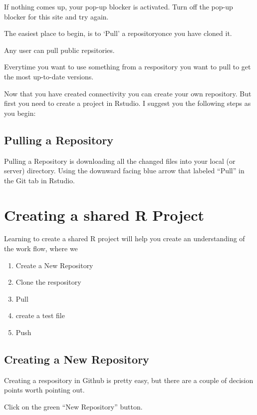 \documentclass[12pt]{../SOP3_beta}
\begin{document}
\NP If nothing comes up, your pop-up blocker is activated. Turn off the pop-up blocker for this site and try again. 



\NP The easiest place to begin, is to `Pull' a repositoryonce you have cloned it. 

\NP Any user can pull public repsitories. 

\NP Everytime you want to use something from a respository you want to pull to get the most up-to-date versions. 

\NP Now that you have created connectivity you can create your own repository. But first you need to create a project in Rstudio. I suggest you the following steps as you begin:



\subsection{Pulling a Repository}

\NP Pulling a Repository is downloading all the changed files into your local (or server) directory. Using the downward facing blue arrow that labeled ``Pull'' in the Git tab in Rstudio.

\section{Creating a shared R Project}

\NP Learning to create a shared R project will help you create an understanding of the work flow, where we 

\begin{enumerate}
\item Create a New Repository
\item Clone the respository
\item Pull 
\item create a test file
\item Push
\end{enumerate}


\subsection{Creating a New Repository}

\NP Creating a respository in Github is pretty easy, but there are a couple of decision points worth pointing out.

\NP Click on the green ``New Repository'' button.
\end{document}
